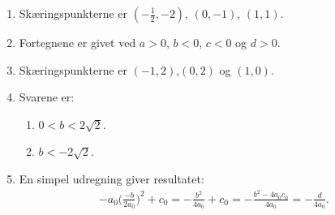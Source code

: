 \begin{enumerate}
	\item Skæringspunkterne er $ (-\frac{1}{2},-2) $, $ (0,-1) $, $ (1,1) $.
	
	\item \label{it:poly2} Fortegnene er givet ved $ a>0 $, $b<0$, $c<0$ og $d>0$.
%	
	
	\item \label{it:poly3} Skæringspunkterne er $ (-1,2) $,$ (0,2) $ og $ (1,0) $.
%	

	
	\item Svarene er:
	\begin{enumerate}
		\item $ 0< b< 2\sqrt{2}$.
		\item $b<-2\sqrt{2}$.
	\end{enumerate}
	
	\item En simpel udregning giver resultatet:
	\begin{align*}
	-a_0 \Big(\frac{-b}{2a_0} \Big)^2+c_0=-\frac{b^2}{4a_0}+c_0=-\frac{b^2-4a_0c_0}{4a_0}=-\frac{d}{4a_0}.
	\end{align*}
\end{enumerate}